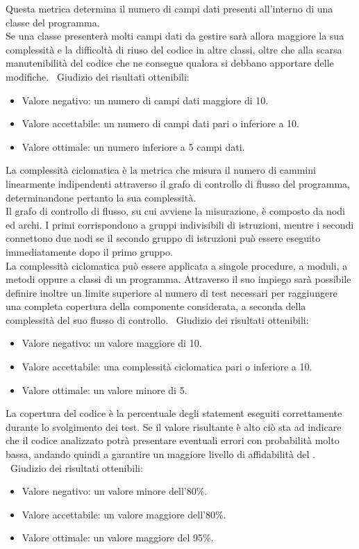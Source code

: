 \documentclass[a4paper, titlepage]{article}
\begin{document}
Questa metrica determina il numero di campi dati presenti all'interno di una classe del programma. \\ Se una classe presenterà molti campi dati da gestire sarà allora maggiore la sua complessità e la difficoltà di riuso del codice in altre classi, oltre che alla scarsa manutenibilità del codice che ne consegue qualora si debbano apportare delle modifiche.
\
\newline Giudizio dei risultati ottenibili:
\begin{itemize}
\item Valore negativo: un numero di campi dati maggiore di 10. 
\item Valore accettabile: un numero di campi dati pari o inferiore a 10.
\item Valore ottimale: un numero inferiore a 5 campi dati.
\end{itemize}

La complessità ciclomatica è la metrica che misura il numero di cammini linearmente indipendenti attraverso il grafo di controllo di flusso del programma, determinandone pertanto la sua complessità.
\\Il grafo di controllo di flusso, su cui avviene la misurazione, è composto da nodi ed archi. I primi corrispondono a gruppi indivisibili di istruzioni, mentre i secondi connettono due nodi se il secondo gruppo di istruzioni può essere eseguito immediatamente dopo il primo gruppo.
\\La complessità ciclomatica può essere
applicata a singole procedure, a moduli, a metodi oppure a classi di un programma.
Attraverso il suo impiego sarà possibile definire inoltre un limite superiore al numero di test necessari per raggiungere una completa copertura della componente considerata, a seconda della complessità del suo flusso di controllo.
\
\newline Giudizio dei risultati ottenibili:
\begin{itemize}
\item Valore negativo: un valore maggiore di 10. 
\item Valore accettabile: una complessità ciclomatica pari o inferiore a 10.
\item Valore ottimale: un valore minore di 5.
\end{itemize}

La copertura del codice è la percentuale degli statement eseguiti correttamente durante lo
svolgimento dei test. Se il valore risultante è alto ciò sta ad indicare che il codice analizzato potrà presentare eventuali errori con probabilità molto bassa, andando quindi a garantire un maggiore livello di affidabilità del .
\
\newline Giudizio dei risultati ottenibili:
\begin{itemize}
\item Valore negativo: un valore minore dell'80\%. 
\item Valore accettabile: un valore maggiore dell'80\%.
\item Valore ottimale: un valore maggiore del 95\%.
\end{itemize}
\end{document}
